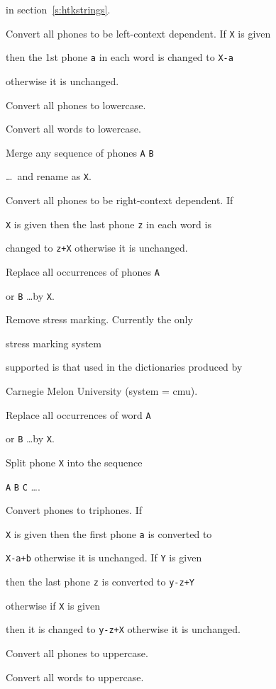 \begin{varlist}
          in section~\ref{s:htkstrings}.


    Convert all phones to be left-context dependent. If \texttt{X} is given


          then the 1st phone \texttt{a} in each word is changed to \texttt{X-a} 


          otherwise it is unchanged.


    Convert all phones to lowercase.


    Convert all words to lowercase.


    Merge any sequence of phones \texttt{A} \texttt{B} 


          \ldots\ and rename as  \texttt{X}.


    Convert all phones to be right-context dependent. If 


          \texttt{X} is given  then the last phone \texttt{z} in each word is


          changed to \texttt{z+X} otherwise it is unchanged.


    Replace all occurrences of phones \texttt{A} 


       or \texttt{B} \ldots by \texttt{X}.


     Remove stress marking.  Currently the only 


         stress marking system 


       supported is that used in the dictionaries produced by 


       Carnegie Melon University (system = cmu).


    Replace all occurrences of word \texttt{A} 


       or \texttt{B} \ldots by \texttt{X}.


    Split phone \texttt{X} into the sequence 


      \texttt{A} \texttt{B} \texttt{C} \ldots.


    Convert phones to triphones. If 


        \texttt{X} is given then the first phone \texttt{a} is converted to 


        \texttt{X-a+b} otherwise it is unchanged. If \texttt{Y} is given


          then the last phone \texttt{z} is converted to \texttt{y-z+Y}


           otherwise if \texttt{X} is given


            then it is changed to  \texttt{y-z+X} otherwise it is unchanged.


    Convert all phones to uppercase.


    Convert all words to uppercase.





\end{varlist}





